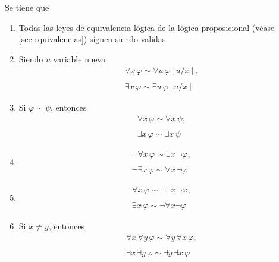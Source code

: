 \begin{theorem} Se tiene que

\begin{enumerate}
	\item Todas las leyes de equivalencia lógica de la lógica proposicional (véase \ref{sec:equivalencias}) siguen siendo validas.
    \item Siendo $u$ variable nueva
    \[\begin{matrix}
    \forall x \, \varphi \sim \forall u \, \varphi[u/x],\\
    \\
    \exists x \, \varphi \sim \exists u \, \varphi[u/x]
    \end{matrix}\]
 
    \item Si $\varphi \sim \psi$, entonces 
\[ \begin{matrix}
\forall x \, \varphi \sim  \forall x \, \psi, \\
\\
\exists x \, \varphi \sim  \exists x \, \psi
\end{matrix} \]    
    
    \item 
\[ \begin{matrix}
\neg \forall x \, \varphi \sim \exists x \, \neg \varphi,\\
\\
\neg \exists x \, \varphi \sim \forall x \, \neg \varphi
\end{matrix} \]    

    \item 
    \[  \begin{matrix}
    \forall x \, \varphi \sim \neg \exists x \, \neg \varphi,\\
    \\
    \exists x \, \varphi \sim \neg \forall x \neg \varphi
\end{matrix}      \]

    \item Si $x \neq y$, entonces 
\[ \begin{matrix}
\forall x \, \forall y \, \varphi \sim \forall y \, \forall x \, \varphi,\\
\\
\exists x \, \exists y \, \varphi \sim \exists y \, \exists x \, \varphi
\end{matrix} \]    
    

\end{enumerate}
\end{theorem}
